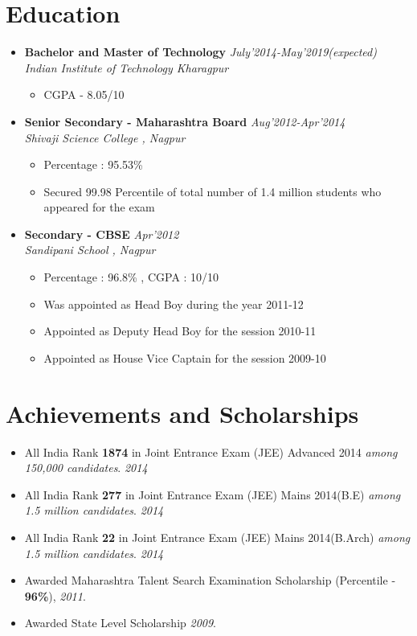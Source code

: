 \documentclass[11pt,a4paper]{moderncv}
\newcommand{\experiencetwo}[4]{
  \vspace{0.1cm}
\item \textbf{\large{#1}} \hfill\textit{#3}\\\textit{#2}
  \begin{itemize}[leftmargin=*]
    \setlength\itemsep{0em} #4
  \end{itemize}
}
\begin{document}
\maketitle
\vspace{-1cm}
\section*{Education}
\begin{itemize}
  \setlength\itemsep{0.5em}

  \experiencetwo{Bachelor and Master of Technology}{Indian Institute of Technology Kharagpur}{July'2014-May'2019(expected)}{
   \item CGPA - 8.05/10
  }
  
  \experiencetwo{Senior Secondary - Maharashtra Board}{Shivaji Science College , Nagpur}{Aug'2012-Apr'2014}{
  \item Percentage : 95.53\%
  \item Secured 99.98 Percentile of total number of 1.4 million students who appeared for the exam 
  }

  \experiencetwo{Secondary - CBSE}{Sandipani School , Nagpur}{Apr'2012}{
  \item Percentage : 96.8\% , CGPA : 10/10
  \item Was appointed as Head Boy during the year 2011-12
  \item Appointed as Deputy Head Boy for the session 2010-11
  \item Appointed as House Vice Captain for the session 2009-10
  }
\end{itemize}

\vspace{-0.1cm}
\section*{Achievements and Scholarships}
\begin{itemize}
  \setlength\itemsep{0.5em}
\item All India Rank \textbf{1874} in Joint Entrance Exam (JEE) Advanced
2014 \textit{among 150,000 candidates}.             \hfill \textit{2014}

\item All India Rank \textbf{277} in Joint Entrance Exam (JEE) Mains 2014(B.E) \textit{among 1.5 million candidates}.              \hfill \textit{2014}

\item All India Rank \textbf{22} in Joint Entrance Exam (JEE) Mains 2014(B.Arch) \textit{among 1.5 million candidates}.              \hfill \textit{2014}

\item Awarded Maharashtra Talent Search Examination Scholarship (Percentile - \textbf{96\%}), \textit{2011}.

\item Awarded State Level Scholarship \textit{2009}.

\end{itemize}
\end{document}
